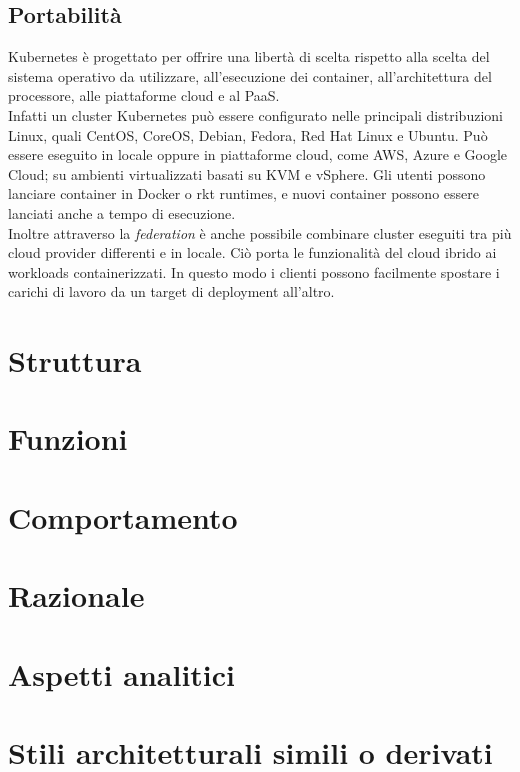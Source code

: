 \documentclass[12pt, a4paper]{report}
\begin{document}
\section{Portabilità}
Kubernetes è progettato per offrire una libertà di scelta rispetto alla scelta del sistema operativo da utilizzare, all'esecuzione dei container, all'architettura del processore, alle piattaforme cloud e al PaaS.\\
Infatti un cluster Kubernetes può essere configurato nelle principali distribuzioni Linux, quali CentOS, CoreOS, Debian, Fedora, Red Hat Linux e Ubuntu. Può essere eseguito in locale oppure in piattaforme cloud, come AWS, Azure e Google Cloud; su ambienti virtualizzati basati su KVM e vSphere. Gli utenti possono lanciare container in Docker o rkt runtimes, e nuovi container possono essere lanciati anche a tempo di esecuzione. \\
Inoltre attraverso la \textit{federation} è anche possibile combinare cluster eseguiti tra più cloud provider differenti e in locale. Ciò porta le funzionalità del cloud ibrido ai workloads containerizzati. In questo modo i clienti possono facilmente spostare i carichi di lavoro da un target di deployment all'altro.
\chapter{Struttura}
\chapter{Funzioni}
\chapter{Comportamento}
\chapter{Razionale}
\chapter{Aspetti analitici}
\chapter{Stili architetturali simili o derivati}

\end{document}
